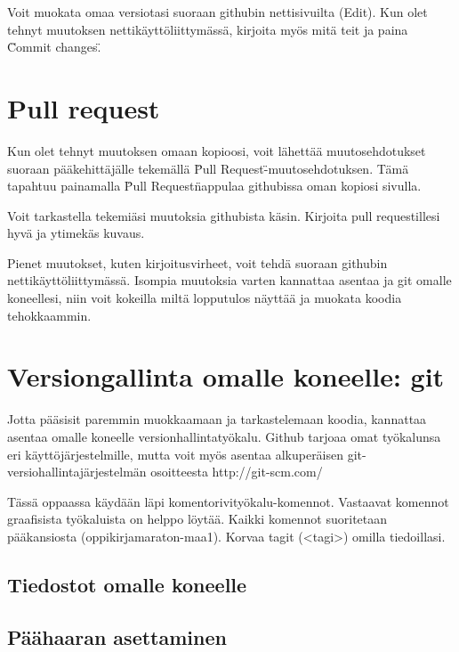 Voit muokata omaa versiotasi suoraan githubin nettisivuilta (Edit). Kun olet tehnyt muutoksen nettikäyttöliittymässä, kirjoita myös mitä teit ja paina \"Commit changes\".

\section{Pull request}

Kun olet tehnyt muutoksen omaan kopioosi, voit lähettää muutosehdotukset suoraan pääkehittäjälle tekemällä \"Pull Request\" -muutosehdotuksen. Tämä tapahtuu painamalla \"Pull Request\" nappulaa githubissa oman kopiosi sivulla.

Voit tarkastella tekemiäsi muutoksia githubista käsin. Kirjoita pull requestillesi hyvä ja ytimekäs kuvaus.


Pienet muutokset, kuten kirjoitusvirheet, voit tehdä suoraan githubin nettikäyttöliittymässä. Isompia muutoksia varten kannattaa asentaa \latex ja git omalle koneellesi, niin voit kokeilla miltä lopputulos näyttää ja muokata koodia tehokkaammin.

\section{Versiongallinta omalle koneelle: git}

Jotta pääsisit paremmin muokkaamaan ja tarkastelemaan koodia, kannattaa asentaa omalle koneelle versionhallintatyökalu. Github tarjoaa omat työkalunsa eri käyttöjärjestelmille, mutta voit myös asentaa alkuperäisen git-versiohallintajärjestelmän osoitteesta http://git-scm.com/

Tässä oppaassa käydään läpi komentorivityökalu-komennot. Vastaavat komennot graafisista työkaluista on helppo löytää. Kaikki komennot suoritetaan pääkansiosta (oppikirjamaraton-maa1). Korvaa tagit (<tagi>) omilla tiedoillasi.

\subsection{Tiedostot omalle koneelle}


\subsection{Päähaaran asettaminen}

